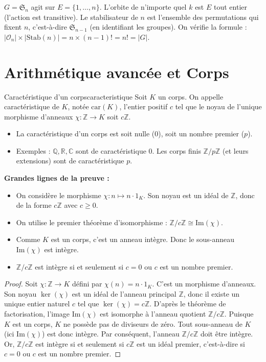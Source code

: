 \documentclass{prepacours}
\begin{document}
\begin{exemple}
    $G = \mathfrak{S}_n$ agit sur $E = \{1, \dots, n\}$.
    L'orbite de n'importe quel $k$ est $E$ tout entier (l'action est transitive).
    Le stabilisateur de $n$ est l'ensemble des permutations qui fixent $n$, c'est-à-dire $\mathfrak{S}_{n-1}$ (en identifiant les groupes).
    On vérifie la formule : $|\mathcal{O}_n| \times |\text{Stab}(n)| = n \times (n-1)! = n! = |G|$.
\end{exemple}

\section{Arithmétique avancée et Corps}

\begin{proposition}{Caractéristique d'un corps}{caracteristique}
    Soit $K$ un corps. On appelle caractéristique de $K$, notée $\text{car}(K)$, l'entier positif $c$ tel que le noyau de l'unique morphisme d'anneaux $\chi : \mathbb{Z} \to K$ soit $c\mathbb{Z}$.
    \begin{itemize}
        \item La caractéristique d'un corps est soit nulle ($0$), soit un nombre premier ($p$).
        \item Exemples : $\mathbb{Q}, \mathbb{R}, \mathbb{C}$ sont de caractéristique $0$. Les corps finis $\mathbb{Z}/p\mathbb{Z}$ (et leurs extensions) sont de caractéristique $p$.
    \end{itemize}
\end{proposition}

\noindent \textbf{Grandes lignes de la preuve :}
\begin{itemize}
    \item On considère le morphisme $\chi : n \mapsto n \cdot 1_K$. Son noyau est un idéal de $\mathbb{Z}$, donc de la forme $c\mathbb{Z}$ avec $c \ge 0$.
    \item On utilise le premier théorème d'isomorphisme : $\mathbb{Z}/c\mathbb{Z} \cong \text{Im}(\chi)$.
    \item Comme $K$ est un corps, c'est un anneau intègre. Donc le sous-anneau $\text{Im}(\chi)$ est intègre.
    \item $\mathbb{Z}/c\mathbb{Z}$ est intègre si et seulement si $c=0$ ou $c$ est un nombre premier.
\end{itemize}

\begin{proof}
    Soit $\chi : \mathbb{Z} \to K$ défini par $\chi(n) = n \cdot 1_K$. C'est un morphisme d'anneaux.
    Son noyau $\ker(\chi)$ est un idéal de l'anneau principal $\mathbb{Z}$, donc il existe un unique entier naturel $c$ tel que $\ker(\chi) = c\mathbb{Z}$.
    D'après le théorème de factorisation, l'image $\text{Im}(\chi)$ est isomorphe à l'anneau quotient $\mathbb{Z}/c\mathbb{Z}$.
    Puisque $K$ est un corps, $K$ ne possède pas de diviseurs de zéro. Tout sous-anneau de $K$ (ici $\text{Im}(\chi)$) est donc intègre.
    Par conséquent, l'anneau $\mathbb{Z}/c\mathbb{Z}$ doit être intègre.
    Or, $\mathbb{Z}/c\mathbb{Z}$ est intègre si et seulement si $c \mathbb{Z}$ est un idéal premier, c'est-à-dire si $c=0$ ou $c$ est un nombre premier.
\end{proof}
\end{document}
